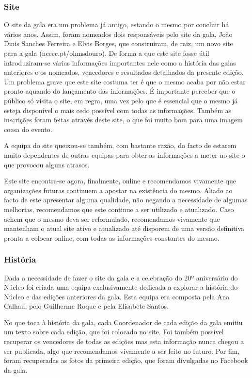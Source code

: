 \subsubsection{Site}
O site da gala era um problema já antigo, estando o mesmo por concluir há vários anos. Assim, foram nomeados dois responsáveis pelo site da gala, João Dinis Sanches Ferreira e Elvis Borges, que construiram, de raiz, um novo site para a gala (neeec.pt/ohmsdouro). De forma a que este site fosse útil introduziram-se várias informações importantes nele como a história das galas anteriores e os nomeados, vencedores e resultados detalhados da presente edição. Um problema grave que este site costuma ter é que o mesmo acaba por não estar pronto aquando do lançamento das informações. É importante perceber que o público só visita o site, em regra, uma vez pelo que é essencial que o mesmo já esteja disponível o mais cedo possível com todas as informações. Também as inscrições foram feitas através deste site, o que foi muito bom para uma imagem coesa do evento.

A equipa do site queixou-se também, com bastante razão, do facto de estarem muito dependentes de outras equipas para obter as informações a meter no site o que provocou alguns atrasos.

Este site encontra-se agora, finalmente, online e recomendamos vivamente que organizações futuras continuem a apostar na existência do mesmo. Aliado ao facto de este apresentar alguma qualidade, não negando a necessidade de algumas melhorias, recomendamos que este continue a ser utilizado e atualizado. Caso achem que o mesmo deva ser reformulado, recomendamos vivamente que mantenham o atual site ativo e atualizado até disporem de uma versão definitiva pronta a colocar online, com todas as informações constantes do mesmo.

\subsubsection{História}
Dada a necessidade de fazer o site da gala e a celebração do 20º aniversário do Núcleo foi criada uma equipa exclusivamente dedicada a explorar a história do Núcleo e das edições anteriores da gala. Esta equipa era composta pela Ana Calhau, pelo Guilherme Roque e pela Elisabete Santos.

No que toca à história da gala, cada Coordenador de cada edição da gala emitiu um texto sobre cada edição, que foi colocado no site. Foi também possível recuperar os vencedores de todas as edições mas esta informação nunca chegou a ser publicada, algo que recomendamos vivamente a ser feito no futuro. Por fim, foram recuperadas as fotos da primeira edição, que foram divulgadas no Facebook da gala.

